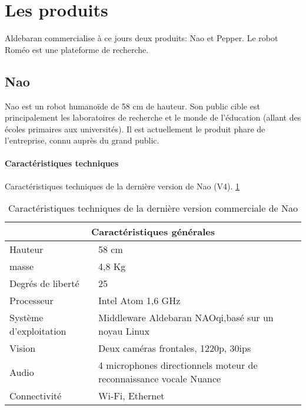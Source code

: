 \section{Les produits}
\label{Entreprise: Les produits}
Aldebaran commercialise à ce jours deux produits: Nao et Pepper. Le robot Roméo est une plateforme de recherche. 

\subsection{Nao}
\label{Entreprise: Les produits: Nao}
Nao est un robot humanoïde de 58 cm de hauteur. Son public cible est principalement les laboratoires de recherche et le monde de l'éducation (allant des écoles primaires aux universités). Il est actuellement le produit phare de l'entreprise, connu auprès du grand public. 

\paragraph{Caractéristiques techniques}
\label{Entreprise:Les produits: Nao: Caractéristiques techniques}
Caractéristiques techniques de la dernière version de Nao (V4). \ref{tab: Caractéristiques technique de Nao}
\newline 

\begin{table}[h]
\begin{tabular}{ | l | p{7cm} | }
\hline
\multicolumn{2}{|c|}{Caractéristiques générales} \\
\hline
Hauteur & 58 cm \\
\hline 
masse & 4,8 Kg \\
\hline 
Degrés de liberté  & 25 \\
\hline
Processeur & Intel Atom 1,6 GHz \\
\hline
Système d'exploitation & Middleware Aldebaran NAOqi,\newline basé sur un noyau Linux \\
\hline 
Vision & Deux caméras frontales, 1220p, 30ips \\
\hline
Audio & 4 microphones directionnels \newline moteur de reconnaissance vocale Nuance  \\
\hline
Connectivité & Wi-Fi, Ethernet \\
\hline
\end{tabular}
\caption[Caractéristiques technique de Nao]{Caractéristiques techniques de la dernière version commerciale  de Nao}
\label {tab: Caractéristiques technique de Nao}
\end{table}

